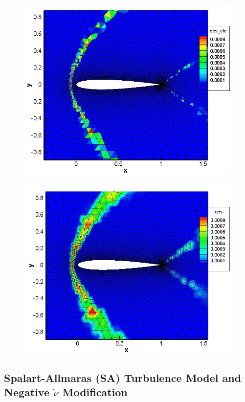 \begin{figure}
\centering
\begin{minipage}[t]{.55\textwidth}
  \centering
  \includegraphics[width=.85\linewidth]{./figures/M1pt6-inv-av-ele-mesh}
  \label{fig:AV-ele}
\end{minipage}%
\begin{minipage}[t]{.55\textwidth}
  \centering
  \includegraphics[width=.85\linewidth]{./figures/M1pt6-inv-av-mesh}
  \label{fig:AV-cont}
\end{minipage}
\end{figure} 

\subsection{Spalart-Allmaras (SA) Turbulence Model and Negative $\tilde\nu$ Modification}

